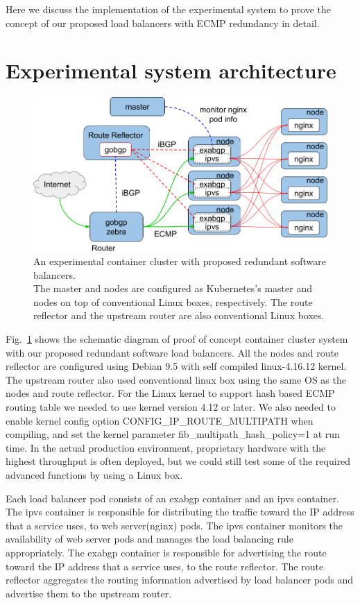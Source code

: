 Here we discuss the implementation of the experimental system to prove the concept of our proposed load balancers with ECMP redundancy in detail.

\section{Experimental system architecture}

\begin{figure}[tb]
\begin{center}
\includegraphics[width=0.8\columnwidth]{Figs/poc.png}
\end{center}
\caption{
  An experimental container cluster with proposed redundant software balancers. \\ %
  The master and nodes are configured as Kubernetes's master and nodes on top of conventional Linux boxes, respectively.
  The route reflector and the upstream router are also conventional Linux boxes.
}
\label{fig:poc}
\end{figure}

Fig.~\ref{fig:poc} shows the schematic diagram of proof of concept container cluster system with our proposed redundant software load balancers.
All the nodes and route reflector are configured using Debian 9.5 with self compiled linux-4.16.12 kernel.  
The upstream router also used conventional linux box using the same OS as the nodes and route reflector.
For the Linux kernel to support hash based ECMP routing table we needed to use kernel version 4.12 or later.
We also needed to enable kernel config option CONFIG\_IP\_ROUTE\_MULTIPATH\cite{ip-sysctl} when compiling, and set the kernel parameter fib\_multipath\_hash\_policy=1 at run time.
In the actual production environment, proprietary hardware with the highest throughput is often deployed, but we could still test some of the required advanced functions by using a Linux box.

Each load balancer pod consists of an exabgp container and an ipvs container.
The ipvs container is responsible for distributing the traffic toward the IP address that a service uses, to web server(nginx) pods.
The ipvs container monitors the availability of web server pods and manages the load balancing rule appropriately.
The exabgp container is responsible for advertising the route toward the IP address that a service uses, to the route reflector.
The route reflector aggregates the routing information advertised by load balancer pods and advertise them to the upstream router.

